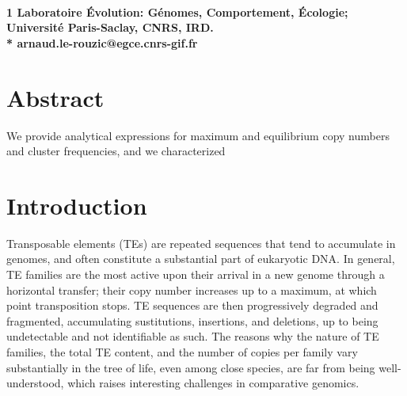 \documentclass[10pt,a4paper]{article}
\title{}
\date{}
\begin{document}
\vspace*{0.35in}

\begin{flushleft}
{\Large
\textbf{}
}
\newline
\\
\bigskip
\bf{1} Laboratoire Évolution: Génomes, Comportement, Écologie; Université Paris-Saclay, CNRS, IRD.
\\
\bigskip
* arnaud.le-rouzic@egce.cnrs-gif.fr

\end{flushleft}

\section*{Abstract}

We provide analytical expressions for maximum and equilibrium copy numbers and cluster frequencies, and we characterized 


\linenumbers

\section{Introduction}

Transposable elements (TEs) are repeated sequences that tend to accumulate in genomes, and often constitute a substantial part of eukaryotic DNA. In general, TE families are the most active upon their arrival in a new genome through a horizontal transfer; their copy number increases up to a maximum, at which point transposition stops. TE sequences are then progressively degraded and fragmented, accumulating sustitutions, insertions, and deletions, up to being undetectable and not identifiable as such. The reasons why the nature of TE families, the total TE content, and the number of copies per family vary substantially in the tree of life, even among close species, are far from being well-understood, which raises interesting challenges in comparative genomics. 
\end{document}
